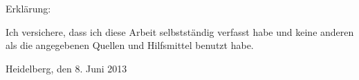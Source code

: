\newpage
\thispagestyle{empty}
\setlength{\parindent}{0em}

Erkl\"{a}rung:\par
\vspace{3\baselineskip}
Ich versichere, dass ich diese Arbeit selbstst\"{a}ndig verfasst habe und keine
anderen als die angegebenen Quellen und Hilfsmittel benutzt habe.\par
\vspace{5\baselineskip}
Heidelberg, den 8. Juni 2013\hspace{3cm}\dotfill
